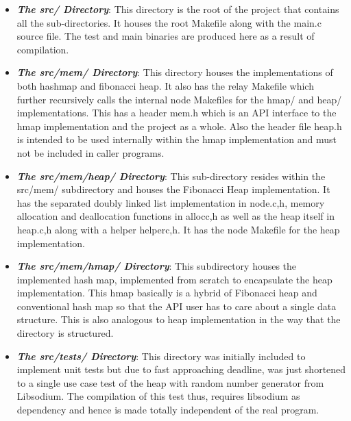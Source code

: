 \documentclass[conference,a4paper,12pt]{IEEEtran}
\begin{document}
	\begin{itemize}
		\item{\textbf{\textit{The src/ Directory}}:}
		This directory is the root of the project that contains all the sub-directories. It houses the root Makefile along with the main.c source file. The test and main binaries are produced here as a result of compilation.
		\item{\textbf{\textit{The src/mem/ Directory}}:}
		This directory houses the implementations of both hashmap and fibonacci heap. It also has the relay Makefile which further recursively calls the internal node Makefiles for the hmap/ and heap/ implementations. This has a header mem.h which is an API interface to the hmap implementation and the project as a whole. Also the header file heap.h is intended to be used internally within the hmap implementation and must not be included in caller programs.
		\item{\textbf{\textit{The src/mem/heap/ Directory}}:}
		This sub-directory resides within the src/mem/ subdirectory and houses the Fibonacci Heap implementation. It has the separated doubly linked list implementation in node.{c,h}, memory allocation and deallocation functions in alloc{c,h} as well as the heap itself in heap.{c,h} along with a helper helper{c,h}. It has the node Makefile for the heap implementation.
		\item{\textbf{\textit{The src/mem/hmap/ Directory}}:}
		This subdirectory houses the implemented hash map, implemented from scratch to encapsulate the heap implementation. This hmap basically is a hybrid of Fibonacci heap and conventional hash map so that the API user has to care about a single data structure. This is also analogous to heap implementation in the way that the directory is structured.
		\item{\textbf{\textit{The src/tests/ Directory}}:}
		This directory was initially included to implement unit tests but due to fast approaching deadline, was just shortened to a single use case test of the heap with random number generator from Libsodium. The compilation of this test thus, requires libsodium as dependency and hence is made totally independent of the real program.
	\end{itemize}
	
\end{document}
